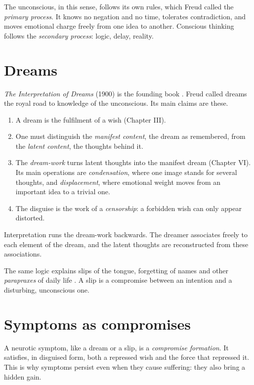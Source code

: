 The unconscious, in this sense, follows
its own rules, which Freud called the
\emph{primary process}. It knows no
negation and no time, tolerates
contradiction, and moves emotional
charge freely from one idea to another.
Conscious thinking follows the
\emph{secondary process}: logic, delay,
reality.

\section{Dreams}
\label{section-dreams}

\emph{The Interpretation of Dreams}
(1900) is the founding book
\cite{freud-se-4-5-dreams}. Freud called
dreams the royal road to knowledge of
the unconscious. Its main claims are
these.

\begin{enumerate}
\item A dream is the fulfilment of a
wish (Chapter III).
\item One must distinguish the
\emph{manifest content}, the dream as
remembered, from the \emph{latent
content}, the thoughts behind it.
\item The \emph{dream-work} turns latent
thoughts into the manifest dream
(Chapter VI). Its main operations are
\emph{condensation}, where one image
stands for several thoughts, and
\emph{displacement}, where emotional
weight moves from an important idea to
a trivial one.
\item The disguise is the work of a
\emph{censorship}: a forbidden wish can
only appear distorted.
\end{enumerate}

Interpretation runs the dream-work
backwards. The dreamer associates freely
to each element of the dream, and the
latent thoughts are reconstructed from
these associations.

The same logic explains slips of the
tongue, forgetting of names and other
\emph{parapraxes} of daily life
\cite{freud-se-6-everyday}. A slip is a
compromise between an intention and a
disturbing, unconscious one.

\section{Symptoms as compromises}
\label{section-symptoms}

A neurotic symptom, like a dream or a
slip, is a \emph{compromise formation}.
It satisfies, in disguised form, both a
repressed wish and the force that
repressed it. This is why symptoms
persist even when they cause suffering:
they also bring a hidden gain.

